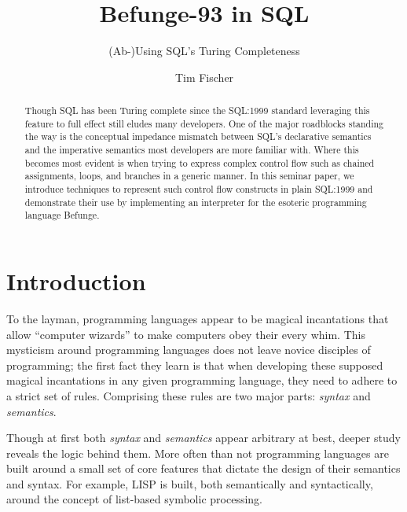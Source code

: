 \documentclass[sigconf,nonacm,screen,review,balance=false]{acmart}
\begin{document}
\title{Befunge-93 in SQL}
\subtitle{(Ab-)Using SQL's Turing Completeness}

\author{Tim Fischer}

\begin{abstract}
  Though SQL has been Turing complete since the SQL:1999 standard leveraging
  this feature to full effect still eludes many developers. One of the major
  roadblocks standing the way is the conceptual impedance mismatch between SQL's
  declarative semantics and the imperative semantics most developers are more
  familiar with. Where this becomes most evident is when trying to express
  complex control flow such as chained assignments, loops, and branches in a
  generic manner. In this seminar paper, we introduce techniques to represent
  such control flow constructs in plain SQL:1999 and demonstrate their use by
  implementing an interpreter for the esoteric programming language Befunge.
\end{abstract}


\maketitle

\section{Introduction}

To the layman, programming languages appear to be magical incantations that
allow ``computer wizards'' to make computers obey their every whim. This
mysticism around programming languages does not leave novice disciples of
programming; the first fact they learn is that when developing these supposed
magical incantations in any given programming language, they need to adhere to
a strict set of rules. Comprising these rules are two major parts:
\emph{syntax} and \emph{semantics}.

Though at first both \emph{syntax} and \emph{semantics} appear arbitrary at
best, deeper study reveals the logic behind them. More often than not
programming languages are built around a small set of core features that
dictate the design of their semantics and syntax. For example, LISP
\cite{mccarthy1962lisp} is built, both semantically and syntactically, around
the concept of list-based symbolic processing.
\end{document}
